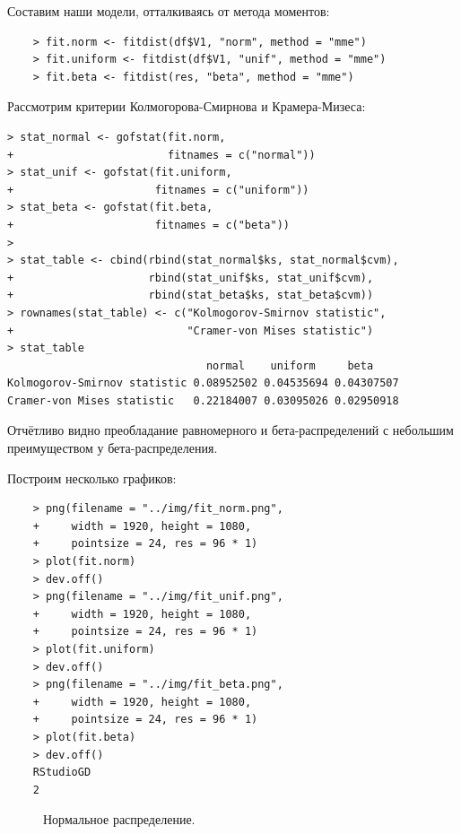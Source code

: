 \documentclass[14pt,a4paper]{scrartcl}
\begin{document}
Составим наши модели, отталкиваясь от метода моментов:
\begin{lstlisting}
	> fit.norm <- fitdist(df$V1, "norm", method = "mme")
	> fit.uniform <- fitdist(df$V1, "unif", method = "mme")
	> fit.beta <- fitdist(res, "beta", method = "mme")
\end{lstlisting}

Рассмотрим критерии Колмогорова-Смирнова и Крамера-Мизеса:
\begin{lstlisting}
> stat_normal <- gofstat(fit.norm, 
+                        fitnames = c("normal"))
> stat_unif <- gofstat(fit.uniform, 
+                      fitnames = c("uniform"))
> stat_beta <- gofstat(fit.beta, 
+                      fitnames = c("beta"))
> 
> stat_table <- cbind(rbind(stat_normal$ks, stat_normal$cvm),  
+                     rbind(stat_unif$ks, stat_unif$cvm),
+                     rbind(stat_beta$ks, stat_beta$cvm))
> rownames(stat_table) <- c("Kolmogorov-Smirnov statistic", 
+                           "Cramer-von Mises statistic")
> stat_table
                               normal    uniform     beta
Kolmogorov-Smirnov statistic 0.08952502 0.04535694 0.04307507
Cramer-von Mises statistic   0.22184007 0.03095026 0.02950918
\end{lstlisting}

Отчётливо видно преобладание равномерного и бета-распределений с небольшим преимуществом у бета-распределения.

Построим несколько графиков:
\begin{lstlisting}
	> png(filename = "../img/fit_norm.png", 
	+     width = 1920, height = 1080,
	+     pointsize = 24, res = 96 * 1)
	> plot(fit.norm)
	> dev.off()
	> png(filename = "../img/fit_unif.png", 
	+     width = 1920, height = 1080,
	+     pointsize = 24, res = 96 * 1)
	> plot(fit.uniform)
	> dev.off() 
	> png(filename = "../img/fit_beta.png", 
	+     width = 1920, height = 1080,
	+     pointsize = 24, res = 96 * 1)
	> plot(fit.beta)
	> dev.off()
	RStudioGD 
	2 

\end{lstlisting}

\begin{figure}[h]
	\caption{Нормальное распределение.}
	\label{ris:fit_norm}
\end{figure}
\end{document}
